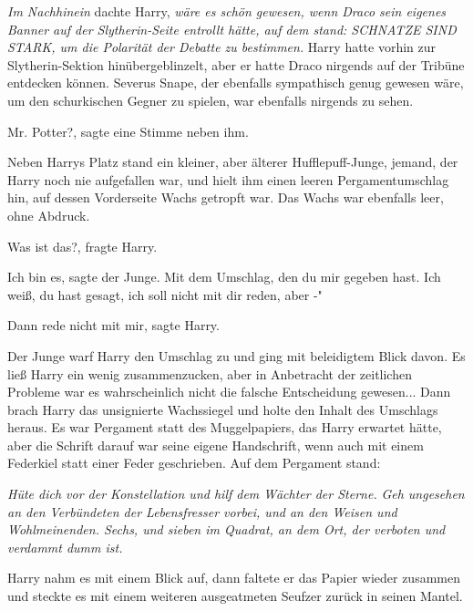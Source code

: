 \emph{Im Nachhinein }dachte Harry, \emph{wäre es schön gewesen, wenn Draco sein
eigenes Banner auf der Slytherin-Seite entrollt hätte, auf dem stand: \glqq
SCHNATZE SIND STARK\grqq{}, um die Polarität der Debatte zu bestimmen.} Harry
hatte vorhin zur Slytherin-Sektion hinübergeblinzelt, aber er hatte Draco
nirgends auf der Tribüne entdecken können. Severus Snape, der ebenfalls
sympathisch genug gewesen wäre, um den schurkischen Gegner zu spielen, war
ebenfalls nirgends zu sehen.

\glqq Mr. Potter?\grqq{}, sagte eine Stimme neben ihm.

Neben Harrys Platz stand ein kleiner, aber älterer Hufflepuff-Junge, jemand, der
Harry noch nie aufgefallen war, und hielt ihm einen leeren Pergamentumschlag
hin, auf dessen Vorderseite Wachs getropft war. Das Wachs war ebenfalls leer,
ohne Abdruck.

\glqq Was ist das?\grqq{}, fragte Harry.

\glqq Ich bin es\grqq{}, sagte der Junge. \glqq Mit dem Umschlag, den du mir
gegeben hast. Ich weiß, du hast gesagt, ich soll nicht mit dir reden, aber -"

\glqq Dann rede nicht mit mir\grqq{}, sagte Harry.

Der Junge warf Harry den Umschlag zu und ging mit beleidigtem Blick davon. Es
ließ Harry ein wenig zusammenzucken, aber in Anbetracht der zeitlichen Probleme
war es wahrscheinlich nicht die falsche Entscheidung gewesen... Dann brach Harry
das unsignierte Wachssiegel und holte den Inhalt des Umschlags heraus. Es war
Pergament statt des Muggelpapiers, das Harry erwartet hätte, aber die Schrift
darauf war seine eigene Handschrift, wenn auch mit einem Federkiel statt einer
Feder geschrieben. Auf dem Pergament stand:

\emph{Hüte dich vor der Konstellation und hilf dem Wächter der Sterne. }
\emph{Geh ungesehen an den Verbündeten der Lebensfresser vorbei, und an den
Weisen und Wohlmeinenden. Sechs, und sieben im Quadrat, an dem Ort, der verboten
und verdammt dumm ist.}

Harry nahm es mit einem Blick auf, dann faltete er das Papier wieder zusammen
und steckte es mit einem weiteren ausgeatmeten Seufzer zurück in seinen Mantel.

